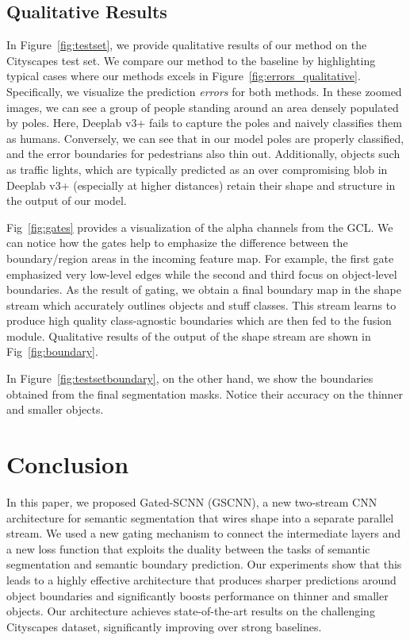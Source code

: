 \documentclass[10pt,twocolumn,letterpaper]{article}
\begin{document}
\subsection{Qualitative Results}
In Figure~\ref{fig:testset}, we provide qualitative results of our method on the Cityscapes test set.
We compare our method to the baseline by highlighting typical cases where our methods excels in Figure~\ref{fig:errors_qualitative}. Specifically, we visualize the prediction \emph{errors} for both methods.
In these zoomed images, we can see a group of people standing around an area densely populated by poles. 
Here, Deeplab v3+ fails to capture the poles and naively classifies them as humans.
Conversely, we can see that in our model poles are properly classified, 
and the error boundaries for pedestrians also thin out.
Additionally, objects such as traffic lights, which are typically predicted as an over compromising blob in Deeplab v3+ (especially at higher distances) retain their shape and structure in the output of our model. 


Fig~\ref{fig:gates} provides a visualization of the alpha channels from the GCL.
We can notice how the gates help to emphasize the difference between the boundary/region areas in the incoming feature map.
For example, the first gate emphasized very low-level edges while the second and third focus on object-level boundaries. 
As the result of gating, we obtain a final boundary map in the shape stream which accurately outlines objects and stuff classes.
This stream learns to produce high quality class-agnostic boundaries which are then fed to the fusion module. Qualitative results of the output of the shape stream are shown in Fig~\ref{fig:boundary}. 

In Figure~\ref{fig:testsetboundary}, on the other hand, we show the boundaries obtained from the final segmentation masks. Notice their accuracy on the thinner and smaller objects. 

 \vspace{-2mm}
\section{Conclusion}
\label{sec:conc}
\vspace{-1mm}
In this paper, we proposed Gated-SCNN (GSCNN), a new two-stream CNN architecture for semantic segmentation that wires shape into a separate parallel stream. 
We used a  new gating mechanism to connect the intermediate layers and a new loss function that exploits the duality between the tasks of semantic segmentation and semantic boundary prediction.
Our experiments show that this leads to a highly effective architecture that produces sharper predictions around object boundaries and significantly boosts performance on thinner and smaller objects. 
Our architecture achieves state-of-the-art results on the challenging Cityscapes dataset,  significantly improving over strong baselines.
 
\end{document}

